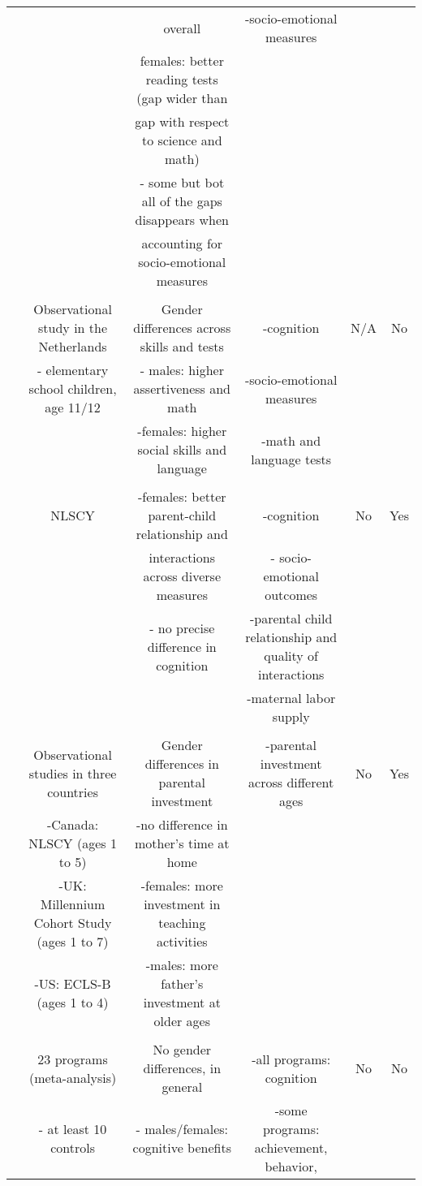 \begin{tabular}{cccccc}
	&		&	overall 	&	-socio-emotional measures	&		&		\\ 
	&		&	females: better reading tests (gap wider than 	&		&		&		\\ 
	&		&	gap with respect to science and math)	&		&		&		\\ 
	&		&	- some but bot all of the gaps disappears when	&		&		&		\\ 
	&		&	accounting for socio-emotional measures 	&		&		&		\\ \\ \midrule
\citet{golsteyn2014gender}	&	Observational study in the Netherlands	&	Gender differences across skills and tests	&	-cognition	&	N/A 	&	No	\\ 
	&	- elementary school children, age 11/12 	&	- males: higher assertiveness and math	&	-socio-emotional measures	&		&		\\ 
	&		&	-females: higher social skills and language	&	-math and language tests	&		&		\\ \\ \midrule
\citet{kottelenberg_Gender}	&	NLSCY	&	-females: better parent-child relationship and 	&	-cognition	&	No	&	Yes	\\ 
	&		&	interactions across diverse measures	&	- socio-emotional outcomes	&		&		\\ 
	&		&	- no precise difference in cognition	&	-parental child relationship and quality of interactions	&		&		\\ 
	&		&		&	-maternal labor supply	&		&		\\ \\ \midrule
\citet{Baker-Milligan_2013_Boy-Girl-Differences}	&	Observational studies in three countries	&	Gender differences in parental investment 	&	-parental investment across different ages	&	No	&	Yes	\\ 
	&	-Canada: NLSCY (ages 1 to 5)	&	-no difference in mother's time at home 	&		&		&		\\ 
	&	-UK: Millennium Cohort Study (ages 1 to 7)	&	-females: more investment in teaching activities	&		&		&		\\ 
	&	-US: ECLS-B (ages 1 to 4)	&	-males: more father's investment at older ages	&		&		&		\\ \\ \midrule
\citet{Magnuson_Kelchen_Duncan_etal_2016_ECRQ}	&	23 programs (meta-analysis)	&	No gender differences, in general	&	-all programs: cognition	&	No	&	No	\\ 
	&	- at least 10 controls	&	- males/females: cognitive benefits	&	-some programs: achievement, behavior,	&		&		\\ 

\end{tabular}
